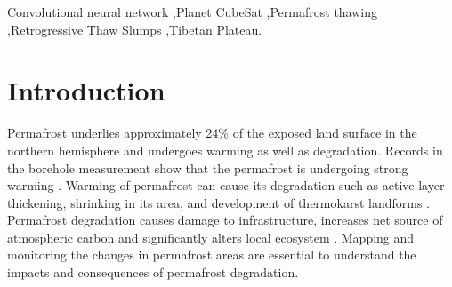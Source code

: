 \documentclass[preprint,12pt,authoryear]{elsarticle}
\begin{document}
\begin{frontmatter}
\begin{abstract}

\end{abstract}

\begin{keyword}


Convolutional neural network \sep Planet CubeSat  \sep Permafrost thawing  \sep Retrogressive Thaw Slumps \sep Tibetan Plateau.

\end{keyword}

\end{frontmatter}


\section{Introduction}
\label{sec_intro}

Permafrost underlies approximately 24\% of the exposed land surface in the northern hemisphere \citep{zhang_statistics_1999} and undergoes warming as well as degradation. Records in the borehole measurement show that the permafrost is undergoing strong warming \citep{marchenko_permafrost_2007,osterkamp2005recent,romanovsky_thermal_2010,romanovsky_permafrost_2010,wu_recent_2008,zhao_thermal_2010}. Warming of permafrost can cause its degradation such as active layer thickening, shrinking in its area, and development of thermokarst landforms \citep{zhao_thermal_2010,akerman_thawing_2008,czudek_thermokarst_1970,jorgenson_response_2005,osterkamp_characteristics_2007}. Permafrost degradation causes damage to infrastructure, increases net source of atmospheric carbon and significantly alters local ecosystem \citep{tong_effect_1996,grosse_vulnerability_2011,olefeldt_circumpolar_2016,schuur_climate_2015,tarnocai_soil_2009,schuster2018permafrost}. Mapping and monitoring the changes in permafrost areas are essential to understand the impacts and consequences of permafrost degradation. 
\end{document}

